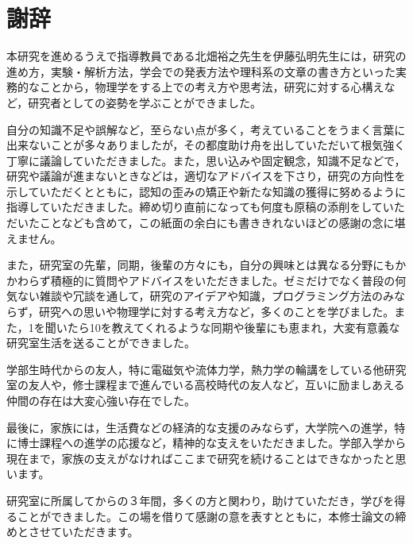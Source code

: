 \documentclass[autodetect-engine,dvi=dvipdfmx,a4paper,ja=standard,oneside,openany,11pt,draft]{bxjsbook}
\begin{document}
\chapter{謝辞}
本研究を進めるうえで指導教員である北畑裕之先生を伊藤弘明先生には，研究の進め方，実験・解析方法，学会での発表方法や理科系の文章の書き方といった実務的なことから，物理学をする上での考え方や思考法，研究に対する心構えなど，研究者としての姿勢を学ぶことができました。

自分の知識不足や誤解など，至らない点が多く，考えていることをうまく言葉に出来ないことが多々ありましたが，その都度助け舟を出していただいて根気強く丁寧に議論していただきました。また，思い込みや固定観念，知識不足などで，研究や議論が進まないときなどは，適切なアドバイスを下さり，研究の方向性を示していただくとともに，認知の歪みの矯正や新たな知識の獲得に努めるように指導していただきました。締め切り直前になっても何度も原稿の添削をしていただいたことなども含めて，この紙面の余白にも書ききれないほどの感謝の念に堪えません。

また，研究室の先輩，同期，後輩の方々にも，自分の興味とは異なる分野にもかかわらず積極的に質問やアドバイスをいただきました。ゼミだけでなく普段の何気ない雑談や冗談を通して，研究のアイデアや知識，プログラミング方法のみならず，研究への思いや物理学に対する考え方など，多くのことを学びました。また，1を聞いたら10を教えてくれるような同期や後輩にも恵まれ，大変有意義な研究室生活を送ることができました。

学部生時代からの友人，特に電磁気や流体力学，熱力学の輪講をしている他研究室の友人や，修士課程まで進んでいる高校時代の友人など，互いに励ましあえる仲間の存在は大変心強い存在でした。

最後に，家族には，生活費などの経済的な支援のみならず，大学院への進学，特に博士課程への進学の応援など，精神的な支えをいただきました。学部入学から現在まで，家族の支えがなければここまで研究を続けることはできなかったと思います。

研究室に所属してからの３年間，多くの方と関わり，助けていただき，学びを得ることができました。この場を借りて感謝の意を表すとともに，本修士論文の締めとさせていただきます。


\ifdraft{
  
  
}{}
\end{document}
